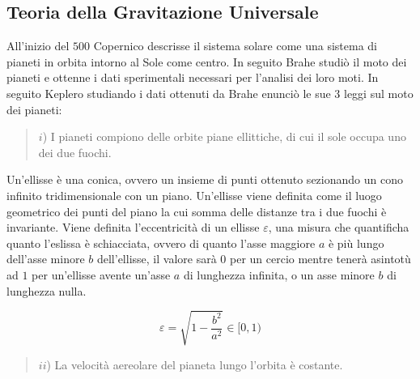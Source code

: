 \documentclass{article}
\numberwithin{equation}{subsection}
\begin{document}
\begin{center}
\end{center}

\subsection{Teoria della Gravitazione Universale}

All'inizio del $500$ Copernico descrisse il sistema solare come una sistema di pianeti in orbita intorno al Sole come centro. In seguito Brahe studiò 
il moto dei pianeti e ottenne i dati sperimentali necessari per l'analisi dei loro moti. In seguito Keplero studiando i dati ottenuti da Brahe 
enunciò le sue $3$ leggi sul moto dei pianeti:

\begin{quotation}
    $i$) I pianeti compiono delle orbite piane ellittiche, di cui il sole occupa uno dei due fuochi.
\end{quotation}

Un'ellisse è una conica, ovvero un insieme di punti ottenuto sezionando un cono infinito tridimensionale con un piano. Un'ellisse viene definita 
come il luogo geometrico dei punti del piano la cui somma delle distanze tra i due fuochi è invariante. Viene definita l'eccentricità 
di un ellisse $\varepsilon$, una misura che quantificha quanto l'eslissa è schiacciata, ovvero di quanto l'asse maggiore $a$ è più lungo dell'asse 
minore $b$ dell'ellisse, il valore sarà $0$ per un cercio mentre tenerà asintotù ad $1$ per un'ellisse avente un'asse $a$ di lunghezza infinita, o un asse minore $b$ di lunghezza nulla. 

\begin{equation*}
    \varepsilon=\sqrt{1-\displaystyle\frac{b^2}{a^2}}\in[0,1)
\end{equation*}

\begin{quotation}
    $ii$) La velocità aereolare del pianeta lungo l'orbita è costante. 
\end{quotation}
\end{document}
